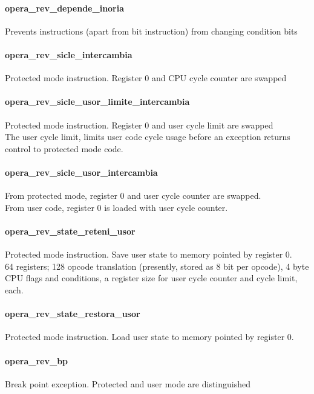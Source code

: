 \documentclass[a4paper,11pt]{article}
\begin{document}
\paragraph{opera\_rev\_depende\_inoria}
  Prevents instructions (apart from bit instruction) from changing condition bits
 
\paragraph{opera\_rev\_sicle\_intercambia}
  Protected mode instruction. Register 0 and CPU cycle counter are swapped
  
\paragraph{opera\_rev\_sicle\_usor\_limite\_intercambia}
  Protected mode instruction. Register 0 and user cycle limit are swapped\\
  The user cycle limit, limits user code cycle usage before an exception returns control to protected mode code.
  
\paragraph{opera\_rev\_sicle\_usor\_intercambia}
  From protected mode, register 0 and user cycle counter are swapped.\\
  From user code, register 0 is loaded with user cycle counter.
 
\paragraph{opera\_rev\_state\_reteni\_usor}
  Protected mode instruction. Save user state to memory pointed by register 0.\\
  64 registers; 128 opcode translation (presently, stored as 8 bit per opcode), 4 byte CPU flags and conditions, a register size for user cycle counter and cycle limit, each.
 
\paragraph{opera\_rev\_state\_restora\_usor}
  Protected mode instruction. Load user state to memory pointed by register 0.
   
\paragraph{opera\_rev\_bp}
  Break point exception. Protected and user mode are distinguished
\end{document}
